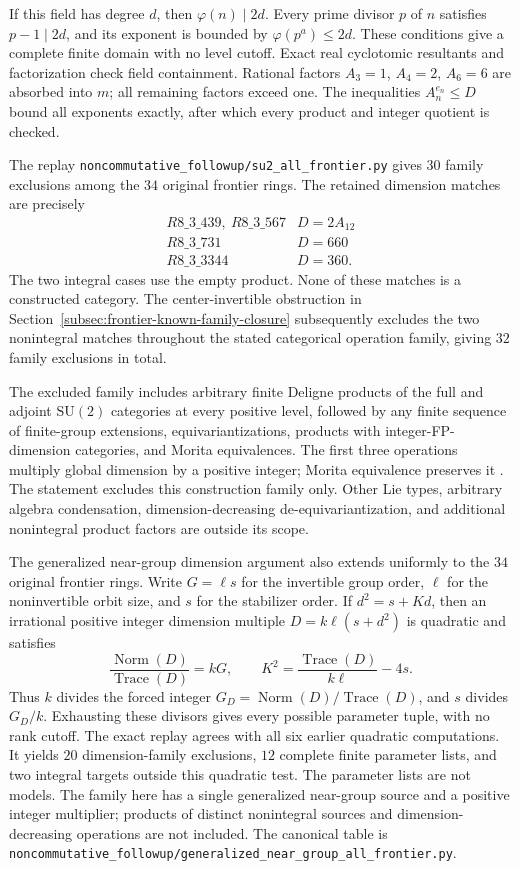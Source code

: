 If this field has degree $d$, then $\varphi(n)\mid2d$.
Every prime divisor $p$ of $n$ satisfies $p-1\mid2d$, and its exponent
is bounded by $\varphi(p^a)\le2d$. These conditions give a complete
finite domain with no level cutoff. Exact real cyclotomic resultants
and factorization check field containment. Rational factors
$A_3=1$, $A_4=2$, $A_6=6$ are absorbed into $m$; all remaining factors
exceed one. The inequalities $A_n^{e_n}\le D$ bound all exponents
exactly, after which every product and integer quotient is checked.

The replay \texttt{noncommutative\_followup/su2\_all\_frontier.py}
gives $30$ family exclusions among the $34$ original frontier rings.
The retained dimension matches are precisely
\[
\begin{array}{c|c}
R8\_3\_439,\ R8\_3\_567&D=2A_{12}\\
R8\_3\_731&D=660\\
R8\_3\_3344&D=360.
\end{array}
\]
The two integral cases use the empty product. None of these matches
is a constructed category. The center-invertible obstruction in
Section~\ref{subsec:frontier-known-family-closure} subsequently excludes
the two nonintegral matches throughout the stated categorical operation
family, giving $32$ family exclusions in total.

The excluded family includes arbitrary finite Deligne products of the
full and adjoint $\mathrm{SU}(2)$ categories at every positive level,
followed by any finite sequence of finite-group extensions,
equivariantizations, products with integer-FP-dimension categories, and
Morita equivalences. The first three operations multiply global
dimension by a positive integer; Morita equivalence preserves it
\cite[Corollary~8.14]{ENO}. The statement excludes this construction
family only. Other Lie types, arbitrary algebra condensation,
dimension-decreasing de-equivariantization, and additional nonintegral
product factors are outside its scope.

The generalized near-group dimension argument also extends uniformly
to the $34$ original frontier rings. Write $G=\ell s$ for the invertible
group order, $\ell$ for the noninvertible orbit size, and $s$ for the
stabilizer order. If $d^2=s+Kd$, then an irrational positive integer
dimension multiple $D=k\ell(s+d^2)$ is quadratic and satisfies
\[
 \frac{\operatorname{Norm}(D)}{\operatorname{Trace}(D)}=kG,
 \qquad K^2=\frac{\operatorname{Trace}(D)}{k\ell}-4s.
\]
Thus $k$ divides the forced integer $G_D=\operatorname{Norm}(D)/
\operatorname{Trace}(D)$, and $s$ divides $G_D/k$. Exhausting these
divisors gives every possible parameter tuple, with no rank cutoff.
The exact replay agrees with all six earlier quadratic computations.
It yields $20$ dimension-family exclusions, $12$ complete finite
parameter lists, and two integral targets outside this quadratic test.
The parameter lists are not models. The family here has a single
generalized near-group source and a positive integer multiplier;
products of distinct nonintegral sources and dimension-decreasing
operations are not included. The canonical table is
\texttt{noncommutative\_followup/generalized\_near\_group\_all\_frontier.py}.

